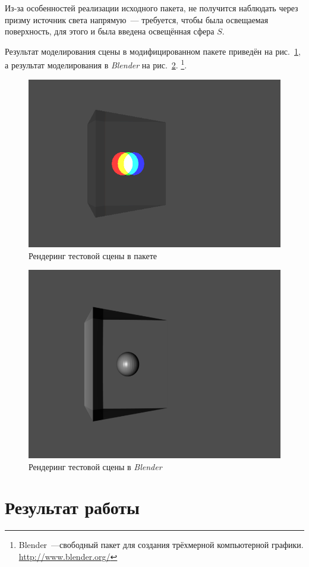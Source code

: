 \documentclass[a4paper,10pt]{article}
\begin{document}
Из-за особенностей реализации исходного пакета, не получится наблюдать через призму источник света напрямую~---
требуется, чтобы была освещаемая поверхность, для этого и была введена освещённая сфера $S$.

Результат моделирования сцены в модифицированном пакете приведён на рис.~\ref{fig:prism-test-brt},
а результат моделирования в \textit{Blender} на рис.~\ref{fig:prism-test-blender}.
\footnote{Blender~---свободный пакет для создания трёхмерной компьютерной графики. \url{http://www.blender.org/}}.
\begin{figure}[h!]
  \centering
  \includegraphics[width=0.4\linewidth]{./screenshots/prism_test_brt.png}
  \caption{Рендеринг тестовой сцены в пакете}
  \label{fig:prism-test-brt}
\end{figure}
\begin{figure}[h!]
  \centering
  \includegraphics[width=0.4\linewidth]{./screenshots/prism_test_blender.png}
  \caption{Рендеринг тестовой сцены в \textit{Blender}}
  \label{fig:prism-test-blender}
\end{figure}

\section{Результат работы}



\end{document}
